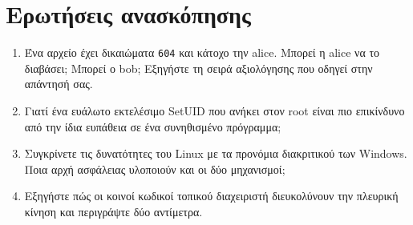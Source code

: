 \section*{Ερωτήσεις ανασκόπησης}
\begin{enumerate}
  \item Ένα αρχείο έχει δικαιώματα \texttt{604} και κάτοχο την alice. Μπορεί η alice να το διαβάσει; Μπορεί ο bob; Εξηγήστε τη σειρά αξιολόγησης που οδηγεί στην απάντησή σας.
  \item Γιατί ένα ευάλωτο εκτελέσιμο SetUID που ανήκει στον root είναι πιο επικίνδυνο από την ίδια ευπάθεια σε ένα συνηθισμένο πρόγραμμα;
  \item Συγκρίνετε τις δυνατότητες του Linux με τα προνόμια διακριτικού των Windows. Ποια αρχή ασφάλειας υλοποιούν και οι δύο μηχανισμοί;
  \item Εξηγήστε πώς οι κοινοί κωδικοί τοπικού διαχειριστή διευκολύνουν την πλευρική κίνηση και περιγράψτε δύο αντίμετρα.
\end{enumerate}
